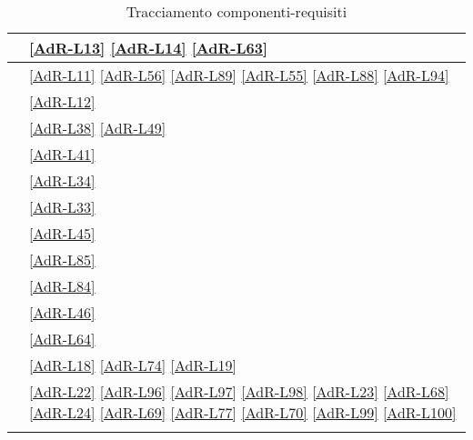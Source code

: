 \begin{longtable}{|P{6cm}|P{6cm}|}
	\hline {} & \ref{AdR-L13} \linebreak \ref{AdR-L14} \linebreak \ref{AdR-L63} \\
	\hline {} & \ref{AdR-L11} \linebreak \ref{AdR-L56} \linebreak \ref{AdR-L89} \linebreak \ref{AdR-L55} \linebreak \ref{AdR-L88} \linebreak \ref{AdR-L94} \\
	\hline {} & \ref{AdR-L12} \\
	\hline {} & \ref{AdR-L38} \linebreak \ref{AdR-L49} \\
	\hline {} & \ref{AdR-L41} \\
	\hline {} & \ref{AdR-L34} \\
	\hline {} & \ref{AdR-L33} \\
	\hline {} & \ref{AdR-L45} \\
	\hline {} & \ref{AdR-L85} \\
	\hline {} & \ref{AdR-L84} \\
	\hline {} & \ref{AdR-L46} \\
	\hline {} & \ref{AdR-L64} \\
	
	\hline {} & \ref{AdR-L18} \linebreak \ref{AdR-L74} \linebreak \ref{AdR-L19} \\
	
	\hline {} & \ref{AdR-L22} \linebreak \ref{AdR-L96} \linebreak \ref{AdR-L97} \linebreak \ref{AdR-L98} \linebreak \ref{AdR-L23} \linebreak \ref{AdR-L68} \linebreak \ref{AdR-L24} \linebreak \ref{AdR-L69} \linebreak \ref{AdR-L77} \linebreak \ref{AdR-L70} \linebreak \ref{AdR-L99} \linebreak \ref{AdR-L100} \\
	
	\hline
	\caption{Tracciamento componenti-requisiti}
\end{longtable}

